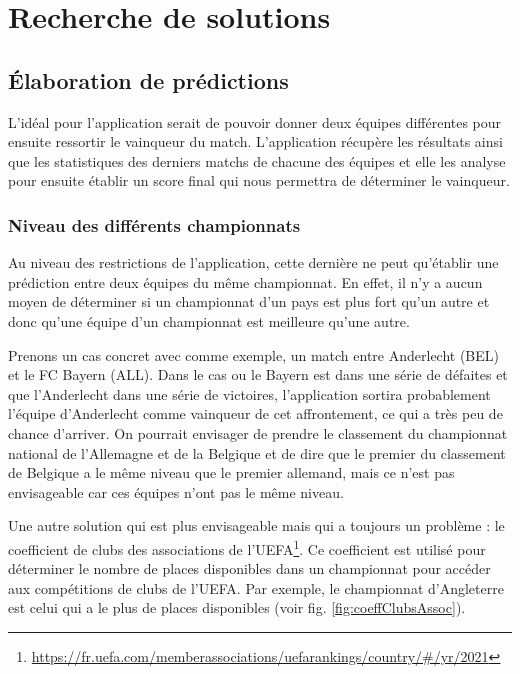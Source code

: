 \documentclass[a4paper,14pt]{extarticle}
\begin{document}
{\section{Recherche de solutions}

\subsection{Élaboration de prédictions}

L'idéal pour l'application serait de pouvoir donner deux équipes différentes pour ensuite ressortir le vainqueur du match. L'application récupère les résultats ainsi que les statistiques des derniers matchs de chacune des équipes et elle les analyse pour ensuite établir un score final qui nous permettra de déterminer le vainqueur.


\subsubsection{Niveau des différents championnats}
\label{niveauDifferentChampionnats}
Au niveau des restrictions de l'application, cette dernière ne peut qu'établir une prédiction entre deux équipes du même championnat. En effet, il n'y a aucun moyen de déterminer si un championnat d'un pays est plus fort qu'un autre et donc qu'une équipe d'un championnat est meilleure qu'une autre. 

Prenons un cas concret avec comme exemple, un match entre Anderlecht (BEL) et le FC Bayern (ALL). Dans le cas ou le Bayern est dans une série de défaites et que l'Anderlecht dans une série de victoires, l'application sortira probablement l'équipe d'Anderlecht comme vainqueur de cet affrontement, ce qui a très peu de chance d'arriver. 
On pourrait envisager de prendre le classement du championnat national de l'Allemagne et de la Belgique et de dire que le premier du classement de Belgique a le même niveau que le premier allemand, mais ce n'est pas envisageable car ces équipes n'ont pas le même niveau.  

Une autre solution qui est plus envisageable mais qui a toujours un problème : le coefficient de clubs des associations de l'UEFA\footnote{\url{https://fr.uefa.com/memberassociations/uefarankings/country/\#/yr/2021}}. Ce coefficient est utilisé pour déterminer le nombre de places disponibles dans un championnat pour accéder aux compétitions de clubs de l'UEFA. Par exemple, le championnat d'Angleterre est celui qui a le plus de places disponibles (voir fig. \ref{fig:coeffClubsAssoc}).

}
\end{document}

